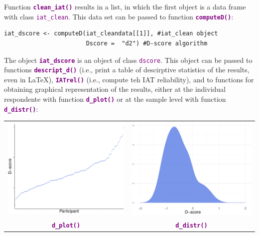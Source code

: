 \documentclass[a0,landscape]{a0poster}
\begin{document}
\begin{multicols*}{3}
Function \textbf{\textcolor{purple}{\texttt{clean\_iat()}}} results in a list, in which the first object is a data frame with class \textcolor{purple}{\texttt{iat\_clean}}. This data set can be passed to function \textbf{\textcolor{purple}{\texttt{computeD()}}}: 
\begin{lstlisting}
iat_dscore <- computeD(iat_cleandata[[1]], #iat_clean object
                       Dscore =  "d2") #D-score algorithm
\end{lstlisting}
The object \textbf{\textcolor{purple}{\texttt{iat\_dscore}}} is an object of class \textcolor{purple}{\texttt{dscore}}. This object can be passed to functions \textbf{\textcolor{purple}{\texttt{descript\_d()}}} (i.e., print a table of descirptive statistics of the results, even in \LaTeX), \textbf{\textcolor{purple}{\texttt{IATrel()}}} (i.e., compute teh IAT reliability), and to functions for obtaining graphical representation of the results, either at the individual respondente with function \textbf{\textcolor{purple}{\texttt{d\_plot()}}} or at the sample level with function \textbf{\textcolor{purple}{\texttt{d\_distr()}}}: 
%
\begin{tabular}{c c}
		\includegraphics[width=0.5\linewidth]{dplot.pdf}
	&
		\includegraphics[width=0.5\linewidth]{ddistr.pdf} \\
		\textbf{\textcolor{purple}{\texttt{d\_plot()}}} & \textbf{\textcolor{purple}{\texttt{d\_distr()}}}\\
\end{tabular}


\end{multicols*}
\end{document}
